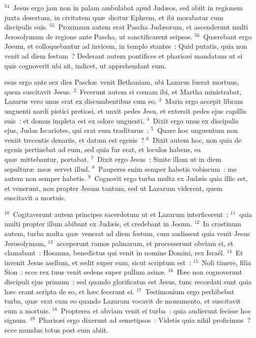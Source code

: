 ${}^{54}$~Jesus ergo jam non in palam ambulabat apud Jud\ae os, sed abiit in regionem juxta desertum, in civitatem qu\ae\ dicitur Ephrem, et ibi morabatur cum discipulis suis.
${}^{55}$~Proximum autem erat Pascha Jud\ae orum, et ascenderunt multi Jerosolymam de regione ante Pascha, ut sanctificarent seipsos.
${}^{56}$~Qu\ae rebant ergo Jesum, et colloquebantur ad invicem, in templo stantes~: Quid putatis, quia non venit ad diem festum~? Dederant autem pontifices et pharis\ae i mandatum ut si quis cognoverit ubi sit, indicet, ut apprehendant eum.

\bchapter
{}esus ergo ante sex dies Pasch\ae\ venit Bethaniam, ubi Lazarus fuerat mortuus, quem suscitavit Jesus.
${}^{2}$~Fecerunt autem ei cœnam ibi, et Martha ministrabat, Lazarus vero unus erat ex discumbentibus cum eo.
${}^{3}$~Maria ergo accepit libram unguenti nardi pistici pretiosi, et unxit pedes Jesu, et extersit pedes ejus capillis suis~: et domus impleta est ex odore unguenti.
${}^{4}$~Dixit ergo unus ex discipulis ejus, Judas Iscariotes, qui erat eum traditurus~:
${}^{5}$~Quare hoc unguentum non veniit trecentis denariis, et datum est egenis~?
${}^{6}$~Dixit autem hoc, non quia de egenis pertinebat ad eum, sed quia fur erat, et loculos habens, ea qu\ae\ mittebantur, portabat.
${}^{7}$~Dixit ergo Jesus~: Sinite illam ut in diem sepultur\ae\ me\ae\ servet illud.
${}^{8}$~Pauperes enim semper habetis vobiscum~: me autem non semper habetis.
${}^{9}$~Cognovit ergo turba multa ex Jud\ae is quia illic est, et venerunt, non propter Jesum tantum, sed ut Lazarum viderent, quem suscitavit a mortuis.


${}^{10}$~Cogitaverunt autem principes sacerdotum ut et Lazarum interficerent~:
${}^{11}$~quia multi propter illum abibant ex Jud\ae is, et credebant in Jesum.
${}^{12}$~In crastinum autem, turba multa qu\ae\ venerat ad diem festum, cum audissent quia venit Jesus Jerosolymam,
${}^{13}$~acceperunt ramos palmarum, et processerunt obviam ei, et clamabant~: Hosanna, benedictus qui venit in nomine Domini, rex Isra\"el.
${}^{14}$~Et invenit Jesus asellum, et sedit super eum, sicut scriptum est~:
${}^{15}$~Noli timere, filia Sion~: ecce rex tuus venit sedens super pullum asin\ae .
${}^{16}$~H\ae c non cognoverunt discipuli ejus primum~: sed quando glorificatus est Jesus, tunc recordati sunt quia h\ae c erant scripta de eo, et h\ae c fecerunt ei.
${}^{17}$~Testimonium ergo perhibebat turba, qu\ae\ erat cum eo quando Lazarum vocavit de monumento, et suscitavit eum a mortuis.
${}^{18}$~Propterea et obviam venit ei turba~: quia audierunt fecisse hoc signum.
${}^{19}$~Pharis\ae i ergo dixerunt ad semetipsos~: Videtis quia nihil proficimus~? ecce mundus totus post eum abiit.


